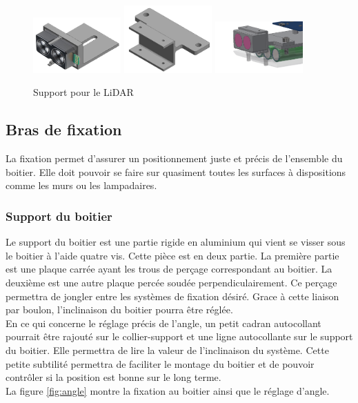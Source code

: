 \begin{figure}[H]
    \centering
    \includegraphics[width=0.3\textwidth]{Images/photos_PGA/lidar dans support.png}
    \includegraphics[width=0.3\textwidth]{Images/photos_PGA/supportLidar2.PNG}
    \includegraphics[width=0.3\textwidth]{Images/photos_PGA/supportlidar.PNG}
    \caption{Support pour le LiDAR}
    \label{fig:supportlidar}
\end{figure}

\subsection{Bras de fixation}

La fixation permet d’assurer un positionnement juste et précis de l’ensemble du boitier. Elle
doit pouvoir se faire sur quasiment toutes les surfaces à dispositions comme les murs ou les 
lampadaires.

\subsubsection{Support du boitier}

Le support du boitier est une partie rigide en aluminium qui vient se visser sous le boitier à l’aide 
quatre vis. Cette pièce est en deux partie. La première partie est une plaque carrée ayant les trous de 
perçage correspondant au boitier. La deuxième est une autre plaque percée soudée perpendiculairement.
Ce perçage permettra de jongler entre les systèmes de fixation désiré. Grace à cette liaison par boulon, 
l’inclinaison du boitier pourra être réglée.\\
En ce qui concerne le réglage précis de l’angle, un petit cadran autocollant pourrait être rajouté 
sur le collier-support et une ligne autocollante sur le support du boitier. Elle permettra de lire la valeur 
de l’inclinaison du système. Cette petite subtilité permettra de faciliter le montage du boitier et 
de pouvoir contrôler si la position est bonne sur le long terme.\\
La figure \ref{fig:angle} montre la fixation au boitier ainsi que le réglage d'angle.

